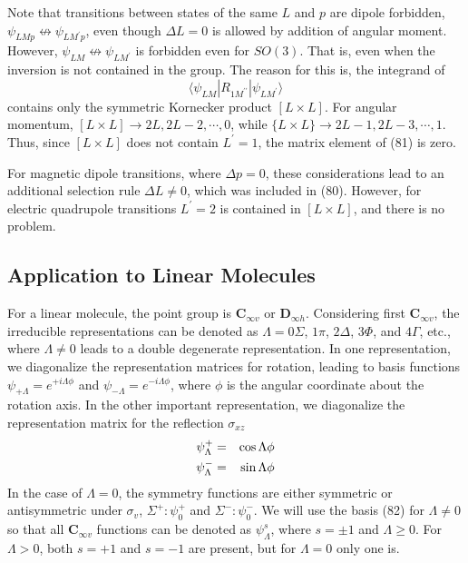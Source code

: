 Note that transitions between states of the same $L$ and $p$ are 
dipole forbidden, $\psi_{LMp} \not\leftrightarrow 
\psi_{LM^{\prime}p}$, even though $\Delta L = 0$ is allowed by 
addition of angular moment.  However, $\psi_{LM} \not\leftrightarrow 
\psi_{LM^{\prime}}$ is forbidden even for $SO(3)$.  That is, even 
when the inversion is not contained in the group.  The reason for this 
is, the integrand of
\begin{equation}
\langle \psi_{LM} | R_{1M^{\prime \prime}} | 
\psi_{LM^{\prime}} \rangle
\label{chap16-eqno81}
\end{equation}
contains only the symmetric Kornecker product $[L \times L]$.  For 
angular momentum, $[L \times L] \rightarrow 2L, 2L - 2 , \cdots , 0$, 
while $\{L \times L\} \rightarrow 2L - 1 , 2L - 3, \cdots , 1$.  
Thus, since $[L \times L]$ does not contain $L^{\prime} = 1$, the 
matrix element of (81) is zero.

For magnetic dipole transitions, where $\Delta p = 0$, these 
considerations lead to an additional selection rule $\Delta L \not= 
0$, which was included in (80).  However, for electric quadrupole 
transitions $L^{\prime} = 2$ is contained in $[L \times L]$, and there 
is no problem.

\subsection{Application to Linear Molecules}

For a linear molecule, the point group is {\bf C}$_{\infty v}$ or {\bf 
D}$_{\infty h}$.  Considering first {\bf C}$_{\infty v}$, the 
irreducible representations can be denoted as $\Lambda = 0 \Sigma$, 
$1 \pi$, $2 \Delta$, $3 \Phi$, and $4 \Gamma$, etc., where $\Lambda 
\not= 0$ leads to a double degenerate representation.  In one 
representation, we diagonalize the representation matrices for 
rotation, leading to basis functions $\psi_{+\Lambda} = 
e^{+i\Lambda \phi}$ and $\psi_{-\Lambda} = e^{-i\Lambda \phi}$, 
where $\phi$ is the angular coordinate about the rotation axis.  In 
the other important representation, we diagonalize the representation 
matrix for the reflection $\sigma_{xz}$
\begin{eqnarray}
\psi^+_{\Lambda} &=& \cos \Lambda \phi\cr
\psi^-_{\Lambda} &=& \sin \Lambda \phi
\label{chap16-eqno82}
\end{eqnarray}
In the case of $\Lambda = 0$, the symmetry functions are either 
symmetric or antisymmetric under $\sigma_v$, $\Sigma^+ : \psi^+_0$ 
and $\Sigma^- : \psi^-_0$.  We will use the basis (82) for $\Lambda 
\not= 0$ so that all {\bf C}$_{\infty v}$ functions can be denoted 
as $\psi^s_{\Lambda}$, where $s = \pm 1$ and $\Lambda \geq 0$.  For 
$\Lambda > 0$, both $s = +1$ and $s = -1$ are present, but for 
$\Lambda = 0$ only one is.

